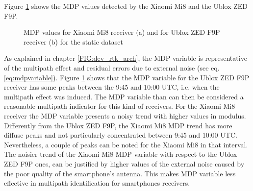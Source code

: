 Figure \ref{FIG:test4mdp_mdpxiaomiublox} shows the MDP values detected by the Xiaomi Mi8 and the Ublox ZED F9P.

\begin{figure}[H] 
	\centering
    \caption{MDP values for Xiaomi Mi8 receiver (a) and for Ublox ZED F9P receiver (b) for the static dataset}
	\label{FIG:test4mdp_mdpxiaomiublox} 
\end{figure}

As explained in chapter \ref{FIG:dev_rtk_arch}, the MDP variable is representative of the multipath effect and residual errors due to external noise (see eq. \ref{eq:mdpvariable}). Figure \ref{FIG:test4mdp_mdpxiaomiublox} shows that the MDP variable for the Ublox ZED F9P receiver has some peaks between the 9:45 and 10:00 UTC, i.e. when the multipath effect was induced. The MDP variable than can then be considered a reasonable multipath indicator for this kind of receivers.
For the Xiaomi Mi8 receiver the MDP variable presents a  noisy trend with higher values in modulus. Differently from the Ublox ZED F9P, the Xiaomi Mi8 MDP trend has more diffuse peaks and not particularly concentrated between  9:45 and 10:00 UTC. Nevertheless, a couple of peaks can be noted for the Xiaomi Mi8 in that interval. The noisier trend of the  Xiaomi Mi8 MDP variable with respect to the Ublox ZED F9P ones, can be justified by  higher values of the external noise caused by the poor quality of the smartphone's antenna. This makes MDP variable less effective in multipath identification for smartphones receivers.  


